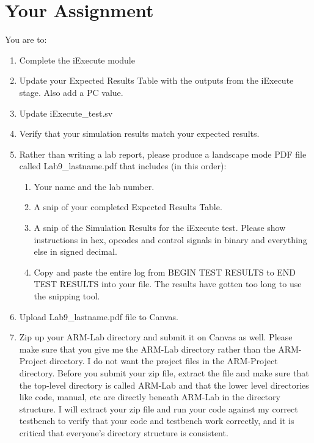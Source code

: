\section{Your Assignment}
You are to:
\begin{enumerate}
\item Complete the iExecute module 
\item Update your Expected Results Table with the outputs from the iExecute stage.  Also add a PC value. 
\item Update iExecute\_test.sv
\item Verify that your simulation results match your expected results.
\item Rather than writing a lab report, please produce a landscape mode PDF file called Lab9\_lastname.pdf that includes (in this order):
\begin{enumerate}
	\item Your name and the lab number.
	\item A snip of your completed Expected Results Table.
	\item A snip of the Simulation Results for the iExecute test.  Please show instructions in hex, opcodes and control signals in binary and everything else in signed decimal.  
	\item Copy and paste the entire log from BEGIN TEST RESULTS to END TEST RESULTS into your file.  The results have gotten too long to use the snipping tool.	
\end{enumerate}
\item Upload Lab9\_lastname.pdf file to Canvas.
\item Zip up your ARM-Lab directory and submit it on Canvas as well.  Please make sure that you give me the ARM-Lab directory rather than the ARM-Project directory.  I do not want the project files in the ARM-Project directory.  Before you submit your zip file, extract the file and make sure that the top-level directory is called ARM-Lab and that the lower level directories like code, manual, etc are directly beneath ARM-Lab in the directory structure.  I will extract your zip file and run your code against my correct testbench to verify that your code and testbench work correctly, and it is critical that everyone's directory structure is consistent.
\end{enumerate} 